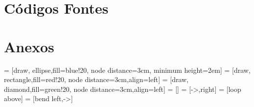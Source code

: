 \section{Códigos Fontes}\label{src}

%
\begin{multicols}{2}    %

\hypertarget{main}{
Código principal},label=main]{../trunk/main.c} }

\end{multicols}

\onecolumn
\section{Anexos}\label{anexo}



 = [draw, ellipse,fill=blue!20, node distance=3cm,
    minimum height=2em]
 = [draw, rectangle,fill=red!20, node distance=3cm,align=left]
 = [draw, diamond,fill=green!20, node distance=3cm,align=left]
 = []   
 = [->,right] %
 = [loop above]
 = [bend left,->]


